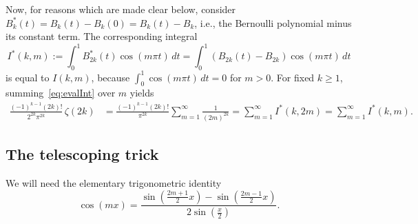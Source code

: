 \documentclass[10pt,reqno]{amsart}
\theoremstyle{remark}
\begin{document}
Now, for reasons which are made clear below, consider $B^{*}_{k}(t) = B_{k}(t) - B_{k}(0) = B_{k}(t) - B_{k}$, i.e., the Bernoulli polynomial minus its constant term. The corresponding integral
\[
  I^{*}(k,m) := \int_0^{1} B_{2k}^{*}(t) \cos(m\pi t)\,dt
              = \int_0^{1} (B_{2k}(t)-B_{2k}) \cos(m\pi t)\,dt
\]
is equal to $I(k,m)$, because $\int_0^{1} \cos(m\pi t)\,dt = 0$ for $m>0$. For fixed $k \geq 1$, summing~\eqref{eq:evalInt} over $m$ yields
\begin{align*}
  \frac{(-1)^{k-1}(2k)!}{2^{2k} \pi^{2k}} \, \zeta(2k)
  &= \frac{(-1)^{k-1}(2k)!}{\pi^{2k}} \sum_{m=1}^{\infty} \frac{1}{(2m)^{2k}}
  = \sum_{m=1}^{\infty} I^{*}(k,2m) %
  = \sum_{m=1}^{\infty} I^{*}(k,m).
\end{align*}

\subsection{The telescoping trick}

We will need the elementary trigonometric identity
%
\begin{equation}
\label{eq:telescope}
  \cos(mx) = \frac{\sin(\frac{2m+1}{2}x)-\sin(\frac{2m-1}{2}x)}{2\sin(\frac{x}{2})}.
\end{equation}
\end{document}
